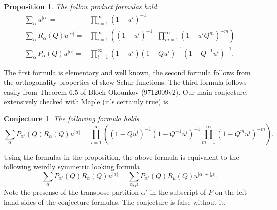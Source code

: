 \documentclass{amsart}
\newtheorem{proposition}[theorem]{Proposition}
\newtheorem{conj}[theorem]{Conjecture}
\theoremstyle{definition}
\begin{document}
\begin{proposition}
The follow product formulas hold.
\begin{align*}
\sum _{\alpha } u^{|\alpha |} =& \prod _{i=1}^{\infty } (1-u^{i})^{-1}\\
\sum _{\alpha } R_{\alpha } (Q) u^{|\alpha |} =&\prod _{i=1}^{\infty }\left( (1-u^{i})^{-1}\cdot\prod _{m=1}^{\infty } (1-u^{i}Q^{m})^{-m} \right)\\
\sum _{\alpha }P_{\alpha } (Q)u^{|\alpha |}=&\prod _{i=1}^{\infty } (1-u^{i}) (1-Qu^{i})^{-1} (1-Q^{-1}u^{i})^{-1}.
\end{align*}
\end{proposition}
The first formula is elementary and well known, the second formula
follows from the orthogonality properties of skew Schur functions. The
third formula follows easily from Theorem 6.5 of Bloch-Okounkov
(9712009v2). Our main conjecture, extensively checked with Maple (it's
certainly true) is
\begin{conj}
The following formula holds
\[
\sum _{\alpha } P_{\alpha '} (Q) R_{\alpha } (Q ) u^{|\alpha |} = \prod _{i=1}^{\infty }\left((1-Qu^{i})^{-1} (1-Q^{-1}u^{i})^{-1}\prod _{m=1}^{\infty } (1-Q^{m}u^{i})^{-m} \right).
\]
\end{conj}

Using the formulas in the proposition, the above formula is equivalent
to the following weirdly symmetric looking formula
\[
\sum _{\alpha } P_{\alpha '} (Q) R_{\alpha } (Q) u^{|\alpha |}  = \sum _{\alpha ,\mu } P_{\alpha '} (Q) R_{\mu } (Q) u^{|\alpha |+|\mu |}.
\]
Note the presense of the transpose partition $\alpha '$ in the
subscript of $P$ on the left hand sides of the conjecture
formulas. The conjecture is false without it.


   
\end{document}
